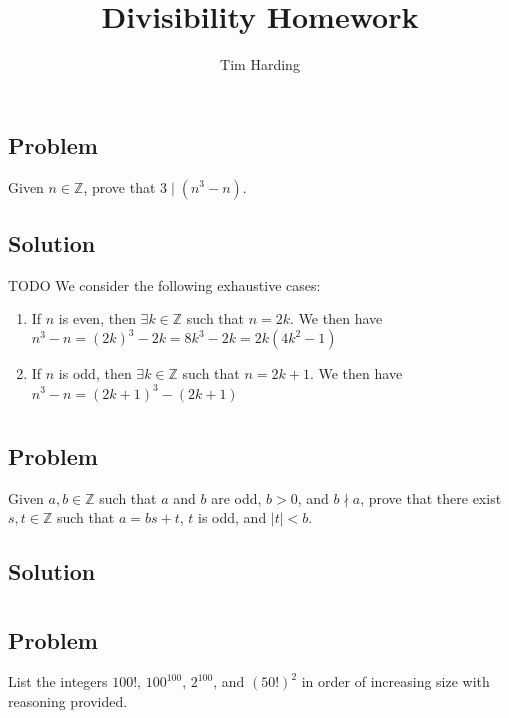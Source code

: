 \documentclass[12pt]{article}
\title{Divisibility Homework}
\author{Tim Harding}
\newcommand{\abs}  [1]{\left|       #1 \right|      }
\newcommand{\Z}    [0]{\mathbb{Z}                   }
\begin{document}
\maketitle

\section{}

\subsection{Problem}
Given $n \in \mathbb{Z}$, prove that $3 \mid (n^3 - n)$.

\subsection{Solution}
TODO
We consider the following exhaustive cases:
\begin{enumerate}
    \item If $n$ is even, then $\exists k \in \Z$ such that $n = 2k$. We then have $n^3 - n = (2k)^3 - 2k = 8k^3 - 2k = 2k(4k^2 - 1)$
    \item If $n$ is odd, then $\exists k \in \Z$ such that $n = 2k + 1$. We then have $n^3 - n = (2k + 1)^3 - (2k + 1)$
\end{enumerate}



\section{}

\subsection{Problem}
Given $a, b \in \Z$ such that $a$ and $b$ are odd, $b > 0$, and $b \nmid a$, prove that there exist $s, t \in \Z$ such that $a = bs + t$, $t$ is odd, and $\abs{t} < b$.

\subsection{Solution}



\section{}

\subsection{Problem}
List the integers $100!$, $100^100$, $2^100$, and $(50!)^2$ in order of increasing size with reasoning provided.
\end{document}
